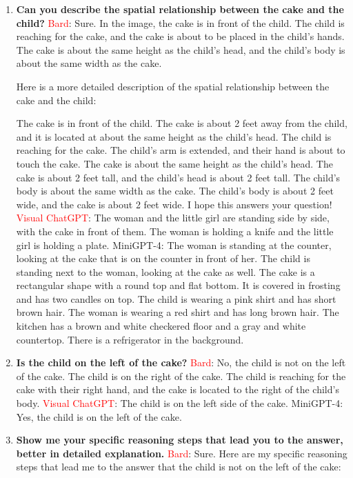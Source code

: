    \begin{enumerate}
        \item \textbf{Can you describe the spatial relationship between the cake and the child?}
        \subitem 
        \textcolor{Red}{Bard}:
        Sure. In the image, the cake is in front of the child. The child is reaching for the cake, and the cake is about to be placed in the child's hands. The cake is about the same height as the child's head, and the child's body is about the same width as the cake.

        Here is a more detailed description of the spatial relationship between the cake and the child:

        The cake is in front of the child. The cake is about 2 feet away from the child, and it is located at about the same height as the child's head.
        The child is reaching for the cake. The child's arm is extended, and their hand is about to touch the cake.
        The cake is about the same height as the child's head. The cake is about 2 feet tall, and the child's head is about 2 feet tall.
        The child's body is about the same width as the cake. The child's body is about 2 feet wide, and the cake is about 2 feet wide.
        I hope this answers your question!
        \subitem \textcolor{red}{Visual ChatGPT}: The woman and the little girl are standing side by side, with the cake in front of them. The woman is holding a knife and the little girl is holding a plate.
        \subitem MiniGPT-4: The woman is standing at the counter, looking at the cake that is on the counter in front of her. The child is standing next to the woman, looking at the cake as well. The cake is a rectangular shape with a round top and flat bottom. It is covered in frosting and has two candles on top. The child is wearing a pink shirt and has short brown hair. The woman is wearing a red shirt and has long brown hair. The kitchen has a brown and white checkered floor and a gray and white countertop. There is a refrigerator in the background.
        \item \textbf{Is the child on the left of the cake?}
        \subitem \textcolor{Red}{Bard}: No, the child is not on the left of the cake. The child is on the right of the cake. The child is reaching for the cake with their right hand, and the cake is located to the right of the child's body.
        \subitem \textcolor{red}{Visual ChatGPT}: The child is on the left side of the cake.
        \subitem MiniGPT-4: Yes, the child is on the left of the cake.
        \item \textbf{Show me your specific reasoning steps that lead you to the answer, better in detailed explanation.}
        \subitem \textcolor{Red}{Bard}:
        Sure. Here are my specific reasoning steps that lead me to the answer that the child is not on the left of the cake:


\end{enumerate}
